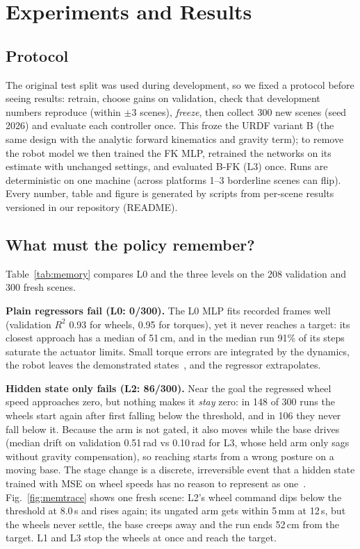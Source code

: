 \documentclass[conference]{IEEEtran}
\begin{document}
\section{Experiments and Results}

\subsection{Protocol}\label{sec:protocol}
The original test split was used during development, so we fixed a protocol before seeing results:
retrain, choose gains on validation, check that development numbers reproduce (within $\pm3$ scenes),
\emph{freeze}, then collect 300 new scenes (seed 2026) and evaluate each controller once. This froze the
URDF variant B (the same design with the analytic forward kinematics and gravity term); to remove the
robot model we then trained the FK MLP, retrained the networks on its estimate with unchanged settings,
and evaluated B-FK (L3) once. Runs are deterministic on one machine (across platforms 1--3 borderline
scenes can flip). Every number, table and figure is generated by scripts from per-scene results
versioned in our repository (README).

\subsection{What must the policy remember?}\label{sec:memory}
Table~\ref{tab:memory} compares L0 and the three levels on the 208 validation and 300 fresh scenes.

\textbf{Plain regressors fail (L0: 0/300).} The L0 MLP fits recorded frames well (validation $R^2$ 0.93
for wheels, 0.95 for torques), yet it never reaches a target: its closest approach has a median of
51\,cm, and in the median run 91\% of its steps saturate the actuator limits. Small torque errors are integrated
by the dynamics, the robot leaves the demonstrated states~\cite{ross2011}, and the regressor extrapolates.

\textbf{Hidden state only fails (L2: 86/300).} Near the goal the regressed wheel speed approaches zero,
but nothing makes it \emph{stay} zero: in 148 of 300 runs the wheels start again after first falling
below the threshold, and in 106 they never fall below it. Because the arm is not gated, it also moves
while the base drives (median drift on validation 0.51\,rad vs 0.10\,rad for L3, whose held arm only sags without
gravity compensation), so reaching starts from a wrong posture on a moving base. The stage change is a discrete, irreversible event that a hidden state trained
with MSE on wheel speeds has no reason to represent as one~\cite{ross2011}. Fig.~\ref{fig:memtrace} shows one fresh scene: L2's wheel
command dips below the threshold at 8.0\,s and rises again; its ungated arm gets within 5\,mm at 12\,s,
but the wheels never settle, the base creeps away and the run ends 52\,cm from the target. L1 and L3 stop
the wheels at once and reach the target.
\end{document}
